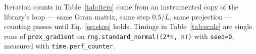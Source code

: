 \documentclass[11pt,a4paper]{article}
\newcommand{\code}[1]{\texttt{#1}}
\begin{document}
Iteration counts in Table~\ref{tab:iters} come from an instrumented copy of the
library's loop --- same Gram matrix, same step $0.5/L$, same projection ---
counting passes until Eq.~\eqref{eq:stop} holds. Timings in
Table~\ref{tab:scale} are single runs of \code{prox\_gradient} on
\code{rng.standard\_normal((2*n, n))} with \code{seed=0}, measured with
\code{time.perf\_counter}.



\end{document}
